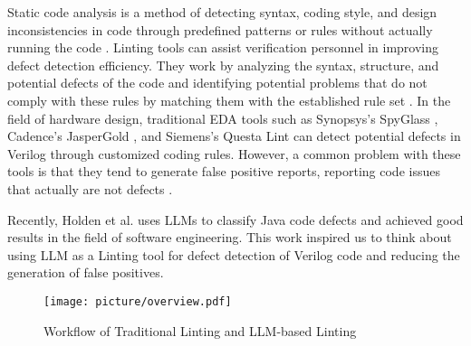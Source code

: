 
Static code analysis is a method of detecting syntax, coding style, and design inconsistencies in code through predefined patterns or rules without actually running the code \cite{journals/ese/VassalloPPPGZ20}. Linting tools can assist verification personnel in improving defect detection efficiency. They work by analyzing the syntax, structure, and potential defects of the code and identifying potential problems that do not comply with these rules by matching them with the established rule set \cite{novak2010taxonomy}. In the field of hardware design, traditional EDA tools such as Synopsys's SpyGlass \cite{SpyGlass}, Cadence's JasperGold \cite{JasperGold}, and Siemens's Questa Lint \cite{QuestaLint} can detect potential defects in Verilog through customized coding rules. However, a common problem with these tools is that they tend to generate false positive reports, reporting code issues that actually are not defects \cite{conf/icse/JohnsonSMB13}.  

Recently, Holden et al. \cite{journals/corr/abs-2406-19508} uses LLMs to classify Java code defects and achieved good results in the field of software engineering. This work inspired us to think about using LLM as a Linting tool for defect detection of Verilog code and reducing the generation of false positives.


\begin{figure}[t]
	\centering
	\texttt{[image: picture/overview.pdf]} %
	\caption{Workflow of Traditional Linting and LLM-based Linting}
	\label{pic1}
	\vspace{-2mm}
\end{figure}